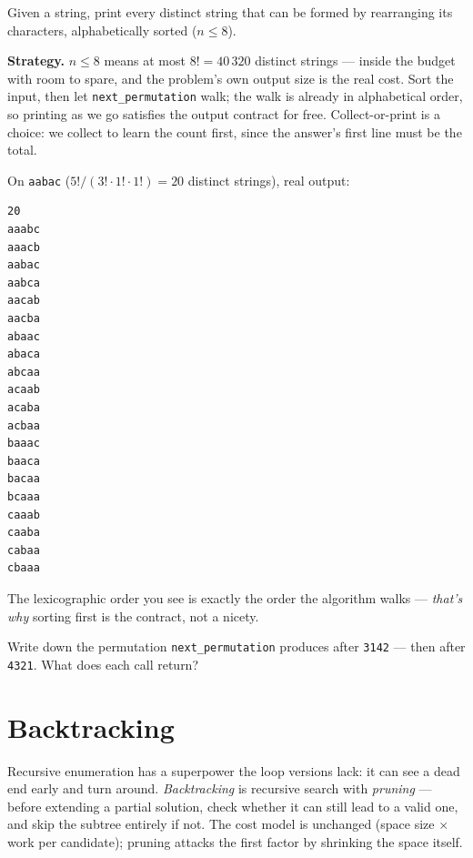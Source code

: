 \begin{example}\label{ex:creating}
Given a string, print every distinct string that can be formed by rearranging
its characters, alphabetically sorted ($n \le 8$).
\par\smallskip
\textbf{Strategy.} $n \le 8$ means at most $8! = 40\,320$ distinct strings ---
inside the budget with room to spare, and the problem's own output size is the
real cost. Sort the input, then let \texttt{next\_permutation} walk; the walk
is already in alphabetical order, so printing as we go satisfies the output
contract for free. Collect-or-print is a choice: we collect to learn the count
first, since the answer's first line must be the total.
\par\smallskip
\begin{solution}

On \texttt{aabac} ($5!/(3! \cdot 1! \cdot 1!) = 20$ distinct strings), real
output:
\begin{lstlisting}[numbers=none]
20
aaabc
aaacb
aabac
aabca
aacab
aacba
abaac
abaca
abcaa
acaab
acaba
acbaa
baaac
baaca
bacaa
bcaaa
caaab
caaba
cabaa
cbaaa
\end{lstlisting}
The lexicographic order you see is exactly the order the algorithm walks ---
\emph{that's why} sorting first is the contract, not a nicety.
\end{solution}
\end{example}

\begin{exercise}[easy]\label{exr:nextperm}
Write down the permutation \texttt{next\_permutation} produces after
\texttt{3142} --- then after \texttt{4321}. What does each call return?
\end{exercise}

\section{Backtracking}\label{sec:backtracking}

Recursive enumeration has a superpower the loop versions lack: it can see a
dead end early and turn around. \emph{Backtracking} is recursive search with
\emph{pruning} --- before extending a partial solution, check
whether it can still lead to a valid one, and skip the subtree entirely if
not. The cost model is unchanged (space size $\times$ work per candidate);
pruning attacks the first factor by shrinking the space itself.

